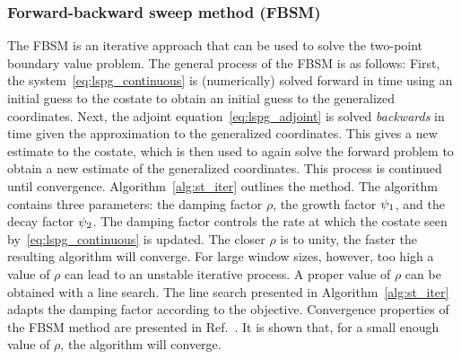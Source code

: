 \subsubsection{Forward-backward sweep method (FBSM)}\label{sec:FBSM}


The FBSM is an iterative approach that can be used to
solve the two-point boundary value problem. The general process of the FBSM is
as follows: First, the system~\eqref{eq:lspg_continuous} is (numerically) solved forward in
time using an initial guess to the costate to obtain an initial guess to
the generalized coordinates. Next, the adjoint equation~\eqref{eq:lspg_adjoint} is solved \textit{backwards} in time given the
approximation to the generalized coordinates. This gives a new estimate to the
costate, which is then used to again solve the forward problem to obtain
a new estimate of the generalized coordinates. This process is continued until
convergence. Algorithm~\ref{alg:st_iter} outlines the method. The algorithm
contains three parameters: the damping factor $\rho$, the growth factor
$\psi_1$, and the decay factor $\psi_2$. The damping factor controls the rate at which the costate seen by~\eqref{eq:lspg_continuous} is updated. The
closer $\rho$ is to unity, the faster the resulting algorithm will converge.
For large window sizes, however, too high a value of $\rho$ can lead to an unstable iterative process. 
A proper value of $\rho$ can be
obtained with a line search. The line search presented in Algorithm~\ref{alg:st_iter} adapts the damping factor
according to the objective. Convergence properties of the FBSM method are
presented in Ref.~\cite{McAsey2012ConvergenceOT}. It is shown that, for a small 
enough value of $\rho$, the algorithm will converge.

